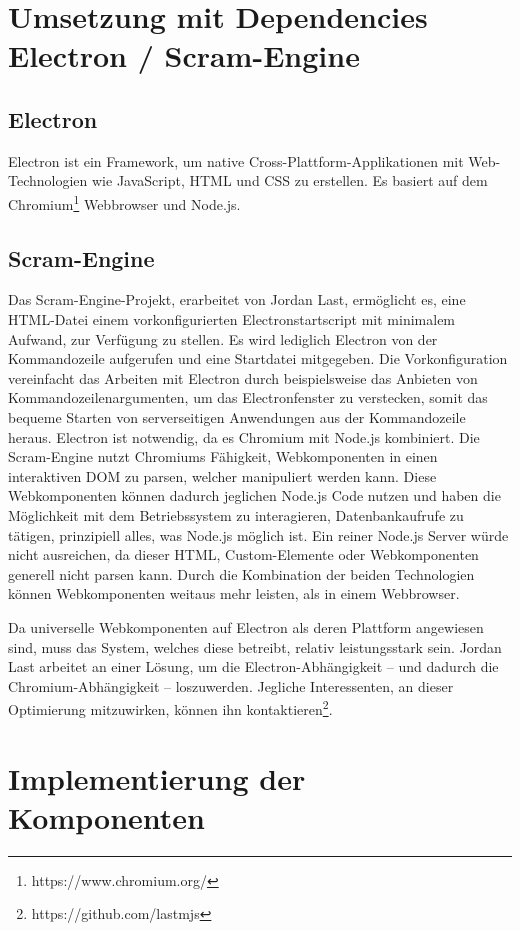 \section{Umsetzung mit Dependencies Electron / Scram-Engine}
\subsection{Electron}
Electron ist ein Framework, um native Cross-Plattform-Applikationen mit Web-Technologien wie JavaScript, HTML und CSS zu erstellen. Es basiert auf dem Chromium\footnote{https://www.chromium.org/} Webbrowser und Node.js.
\subsection{Scram-Engine}
\label{cha:scram-engine}
Das Scram-Engine-Projekt, erarbeitet von Jordan Last, ermöglicht es, eine HTML-Datei einem vorkonfigurierten Electronstartscript mit minimalem Aufwand, zur Verfügung zu stellen. Es wird lediglich Electron von der Kommandozeile aufgerufen und eine Startdatei mitgegeben. Die Vorkonfiguration vereinfacht das Arbeiten mit Electron durch beispielsweise das Anbieten von Kommandozeilenargumenten, um das Electronfenster zu verstecken, somit das bequeme Starten von serverseitigen Anwendungen aus der Kommandozeile heraus.
Electron ist notwendig, da es Chromium mit Node.js kombiniert. Die Scram-Engine nutzt Chromiums Fähigkeit, Webkomponenten in einen interaktiven DOM zu parsen, welcher manipuliert werden kann. Diese Webkomponenten können dadurch jeglichen Node.js Code nutzen und haben die Möglichkeit mit dem Betriebssystem zu interagieren, Datenbankaufrufe zu tätigen, prinzipiell alles, was Node.js möglich ist.
Ein reiner Node.js Server würde nicht ausreichen, da dieser HTML, Custom-Elemente oder Webkomponenten generell nicht parsen kann.
Durch die Kombination der beiden Technologien können Webkomponenten weitaus mehr leisten, als in einem Webbrowser.

Da universelle Webkomponenten auf Electron als deren Plattform angewiesen sind, muss das System, welches diese betreibt, relativ leistungsstark sein. Jordan Last arbeitet an einer Lösung, um die Electron-Abhängigkeit -- und dadurch die Chromium-Abhängigkeit -- loszuwerden. Jegliche Interessenten, an dieser Optimierung mitzuwirken, können ihn kontaktieren\footnote{https://github.com/lastmjs}.

\section{Implementierung der Komponenten}
